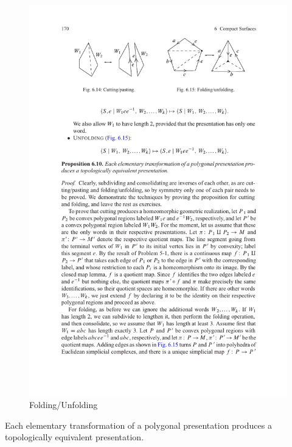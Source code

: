 \begin{figure}[htbp]
\begin{minipage}[t]{200pt}
\includegraphics{folding.pdf}
\caption{Folding/Unfolding}
\end{minipage}
\end{figure}
\begin{proposition}
Each elementary transformation of a polygonal presentation produces a topologically equivalent presentation.
\end{proposition}
